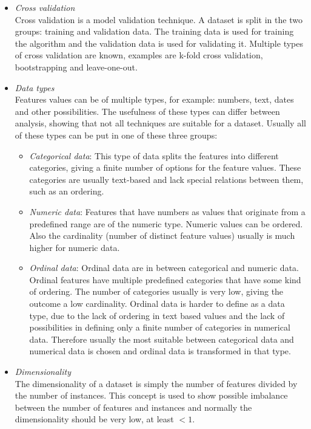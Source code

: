\documentclass[10pt,a4paper]{report}
\begin{document}
\begin{itemize}
		\item \textit{Cross validation} \\
		Cross validation is a model validation technique. A dataset is split in the two groups: training and validation data. The training data is used for training the algorithm and the validation data is used for validating it. Multiple types of cross validation are known, examples are k-fold cross validation, bootstrapping and leave-one-out\cite{kohavi1995study}. 
		\item \textit{Data types} \\
		Features values can be of multiple types, for example: numbers, text, dates and other possibilities. The usefulness of these types can differ between analysis, showing that not all techniques are suitable for a dataset. Usually all of these types  can be put in one of these three groups:
		\begin{itemize}
			\item \textit{Categorical data}: This type of data splits the features into different categories, giving a finite number of options for the feature values. These categories are usually text-based and lack special relations between them, such as an ordering\cite{agresti2003categorical}. 
			\item \textit{Numeric data}: Features that have numbers as values that originate from a predefined range are of the numeric type. Numeric values can be ordered. Also the cardinality (number of distinct feature values) usually is much higher for numeric data\cite{edwards2002explaining}. 
			\item \textit{Ordinal data}: Ordinal data are in between categorical and numeric data. Ordinal features have multiple predefined categories that have some kind of ordering. The number of categories usually is very low, giving the outcome a low cardinality\cite{han2011data}. Ordinal data is harder to define as a data type, due to the lack of ordering in text based values and the lack of possibilities in defining only a finite number of categories in numerical data. Therefore usually the most suitable between categorical data and numerical data is chosen and ordinal data is transformed in that type.
		\end{itemize}
		\item \textit{Dimensionality} \\
		The dimensionality of a dataset is simply the number of features divided by the number of instances. This concept is used to show possible imbalance between the number of features and instances and normally the dimensionality should be very low, at least $<1$.

\end{itemize}
\end{document}
